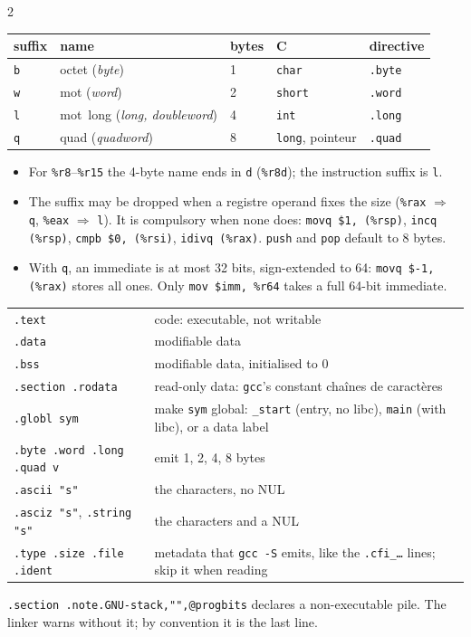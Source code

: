 \begin{multicols}{2}
\begin{tabularx}{\linewidth}{@{}lXlll@{}}
\toprule
suffix & name & bytes & C & directive \\
\midrule
\texttt{b} & octet (\textit{byte})          & 1 & \texttt{char}           & \texttt{.byte} \\
\texttt{w} & mot (\textit{word})            & 2 & \texttt{short}          & \texttt{.word} \\
\texttt{l} & mot~long (\textit{long, doubleword}) & 4 & \texttt{int}      & \texttt{.long} \\
\texttt{q} & quad (\textit{quadword})       & 8 & \texttt{long}, pointeur & \texttt{.quad} \\
\bottomrule
\end{tabularx}
\begin{itemize}[nosep, leftmargin=10pt]
  \item For \texttt{\%r8}--\texttt{\%r15} the 4-byte name ends in \texttt{d} (\texttt{\%r8d}); the
    instruction suffix is \texttt{l}.
  \item The suffix may be dropped when a registre operand fixes the size
    (\texttt{\%rax} $\Rightarrow$ \texttt{q}, \texttt{\%eax} $\Rightarrow$
    \texttt{l}). It is compulsory when none does: \mbox{\texttt{movq \$1, (\%rsp)}},
    \texttt{incq (\%rsp)}, \mbox{\texttt{cmpb \$0, (\%rsi)}}, \texttt{idivq (\%rax)}.
    \texttt{push} and \texttt{pop} default to 8 bytes.
  \item With \texttt{q}, an immediate is at most 32 bits, sign-extended to 64: \mbox{\texttt{movq \$-1, (\%rax)}} stores all ones. Only
    \mbox{\texttt{mov \$imm, \%r64}} takes a full 64-bit
    immediate.
\end{itemize}

\begin{tabularx}{\linewidth}{@{}lX@{}}
\texttt{.text} & code: executable, not writable \\
\texttt{.data} & modifiable data \\
\texttt{.bss} & modifiable data, initialised to 0 \\
\texttt{.section .rodata} & read-only data: \texttt{gcc}'s constant chaînes de caractères \\
\texttt{.globl sym} & make \texttt{sym} global: \texttt{\_start} (entry, no libc), \texttt{main} (with libc), or a data label \\
\texttt{.byte .word .long .quad v} & emit 1, 2, 4, 8 bytes \\
\texttt{.ascii "s"} & the characters, no NUL \\
\texttt{.asciz "s"}, \texttt{.string "s"} & the characters and a NUL \\
\texttt{.type .size .file .ident} & metadata that \texttt{gcc -S} emits, like the \texttt{.cfi\_\dots} lines; skip it when reading \\
\end{tabularx}\par\smallskip
\texttt{.section .note.GNU-stack,"",@progbits} declares a non-executable pile. The
linker warns without it; by convention it is the last line.


\end{multicols}
